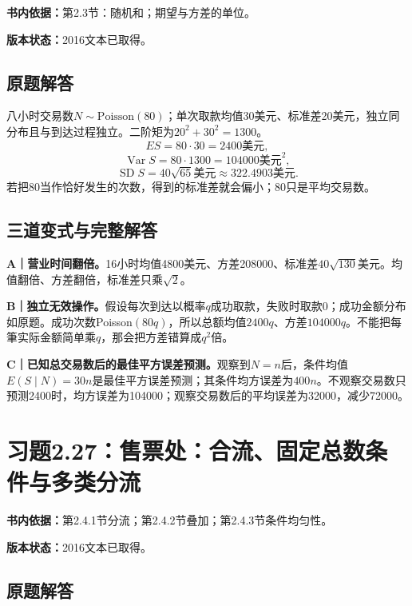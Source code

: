\documentclass[
  11pt,
  a4paper,
  UTF8,fontset=fandol]{ctexart}
\let\OldSection\section
\renewcommand{\section}{\Needspace{7\baselineskip}\OldSection}
\let\OldSubsection\subsection
\renewcommand{\subsection}{\Needspace{5\baselineskip}\OldSubsection}
\begin{document}
\textbf{书内依据：}第2.3节：随机和；期望与方差的单位。

\textbf{版本状态：}2016文本已取得。

\subsection{原题解答}\label{ux539fux9898ux89e3ux7b54-25}

八小时交易数\(N\sim\mathrm{Poisson}(80)\)；单次取款均值30美元、标准差20美元，独立同分布且与到达过程独立。二阶矩为\(20^2+30^2=1300\)。
\[\boxed{ES=80\cdot30=2400\text{美元}},\]
\[\operatorname{Var}S=80\cdot1300=104000\text{美元}^2,\]
\[\boxed{\operatorname{SD}S=40\sqrt{65}\text{美元}\approx322.4903\text{美元}.}\]
若把80当作恰好发生的次数，得到的标准差就会偏小；80只是平均交易数。

\subsection{三道变式与完整解答}\label{ux4e09ux9053ux53d8ux5f0fux4e0eux5b8cux6574ux89e3ux7b54-25}

\textbf{A｜营业时间翻倍。}16小时均值4800美元、方差208000、标准差\(40\sqrt{130}\)美元。均值翻倍、方差翻倍，标准差只乘\(\sqrt2\)。

\textbf{B｜独立无效操作。}假设每次到达以概率\(q\)成功取款，失败时取款0；成功金额分布如原题。成功次数Poisson\((80q)\)，所以总额均值\(2400q\)、方差\(104000q\)。不能把每筆实际金额简单乘\(q\)，那会把方差错算成\(q^2\)倍。

\textbf{C｜已知总交易数后的最佳平方误差预测。}观察到\(N=n\)后，条件均值\(E(S\mid N)=30n\)是最佳平方误差预测；其条件均方误差为\(400n\)。不观察交易数只预测2400时，均方误差为104000；观察交易数后的平均误差为32000，减少72000。

\newpage

\section{习题2.27：售票处：合流、固定总数条件与多类分流}\label{ux4e60ux98982.27ux552eux7968ux5904ux5408ux6d41ux56faux5b9aux603bux6570ux6761ux4ef6ux4e0eux591aux7c7bux5206ux6d41}

\textbf{书内依据：}第2.4.1节分流；第2.4.2节叠加；第2.4.3节条件均匀性。

\textbf{版本状态：}2016文本已取得。

\subsection{原题解答}\label{ux539fux9898ux89e3ux7b54-26}
\end{document}
